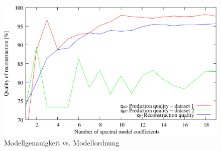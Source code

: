 \begin{figure}[!ht]
	\begin{center}
		\includegraphics[width=0.7\linewidth]{Abbildungen/stand_der_technik/predict_reconstruct_error}
		\caption{Modellgenauigkeit vs. Modellordnung\,\cite{Krajnik.2014}}
		\label{fig.predict_reconstruct_error}	
	\end{center}
	
\end{figure}

